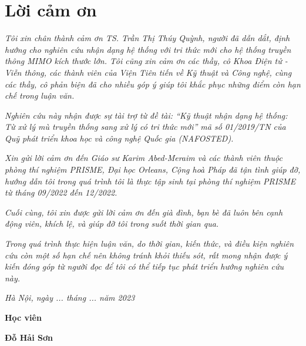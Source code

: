 \clearpage
{}

\chapter*{Lời cảm ơn}

\textit{Tôi xin chân thành cảm ơn TS. Trần Thị Thúy Quỳnh, người đã dẫn dắt, định hướng cho nghiên cứu nhận dạng hệ thống với tri thức mới cho hệ thống truyền thông MIMO kích thước lớn. Tôi cũng xin cảm ơn các thầy, cô Khoa Điện tử - Viễn thông, các thành viên của Viện Tiên tiến về Kỹ thuật và Công nghệ, cùng các thầy, cô phản biện đã cho nhiều góp ý giúp tôi khắc phục những điểm còn hạn chế trong luận văn.}

\textit{Nghiên cứu này nhận được sự tài trợ từ đề tài: ``Kỹ thuật nhận dạng hệ thống: Từ xử lý mù truyền thống sang xử lý có tri thức mới'' mã số 01/2019/TN của Quỹ phát triển khoa học và công nghệ Quốc gia (NAFOSTED).}

\textit{Xin gửi lời cảm ơn đến Giáo sư Karim Abed-Meraim và các thành viên thuộc phòng thí nghiệm PRISME, Đại học Orleans, Cộng hoà Pháp đã tận tình giúp đỡ, hướng dẫn tôi trong quá trình tôi là thực tập sinh tại phòng thí nghiệm PRISME từ tháng 09/2022 đến 12/2022.}

\textit{Cuối cùng, tôi xin được gửi lời cảm ơn đến già đình, bạn bè đã luôn bên cạnh động viên, khích lệ, và giúp đỡ tôi trong suốt thời gian qua.}

\textit{Trong quá trình thực hiện luận văn, do thời gian, kiến thức, và điều kiện nghiên cứu còn một số hạn chế nên không tránh khỏi thiếu sót, rất mong nhận được ý kiến đóng góp từ người đọc để tôi có thể tiếp tục phát triển hướng nghiên cứu này.} 

\vspace{1cm}
\hspace{7cm}\textit{Hà Nội, ngày ... tháng ... năm 2023}

\hspace{9.4cm}\textbf{Học viên}
\vspace{2.5cm}


\hspace{9.3cm}\textbf{Đỗ Hải Sơn}